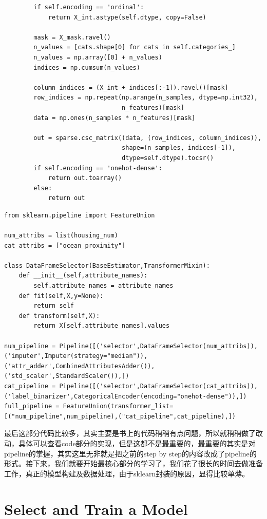 \documentclass[UTF8]{ctexart}
\begin{document}
\begin{lstlisting}
        if self.encoding == 'ordinal':
            return X_int.astype(self.dtype, copy=False)

        mask = X_mask.ravel()
        n_values = [cats.shape[0] for cats in self.categories_]
        n_values = np.array([0] + n_values)
        indices = np.cumsum(n_values)

        column_indices = (X_int + indices[:-1]).ravel()[mask]
        row_indices = np.repeat(np.arange(n_samples, dtype=np.int32),
                                n_features)[mask]
        data = np.ones(n_samples * n_features)[mask]

        out = sparse.csc_matrix((data, (row_indices, column_indices)),
                                shape=(n_samples, indices[-1]),
                                dtype=self.dtype).tocsr()
        if self.encoding == 'onehot-dense':
            return out.toarray()
        else:
            return out
\end{lstlisting}

\begin{lstlisting}
from sklearn.pipeline import FeatureUnion

num_attribs = list(housing_num)
cat_attribs = ["ocean_proximity"]

class DataFrameSelector(BaseEstimator,TransformerMixin):
    def __init__(self,attribute_names):
        self.attribute_names = attribute_names
    def fit(self,X,y=None):
        return self
    def transform(self,X):
        return X[self.attribute_names].values

num_pipeline = Pipeline([('selector',DataFrameSelector(num_attribs)),('imputer',Imputer(strategy="median")),('attr_adder',CombinedAttributesAdder()),('std_scaler',StandardScaler()),])
cat_pipeline = Pipeline([('selector',DataFrameSelector(cat_attribs)),('label_binarizer',CategoricalEncoder(encoding="onehot-dense")),])
full_pipeline = FeatureUnion(transformer_list=[("num_pipeline",num_pipeline),("cat_pipeline",cat_pipeline),])
\end{lstlisting}	

最后这部分代码比较多，其实主要是书上的代码稍稍有点问题，所以就稍稍做了改动，具体可以查看code部分的实现，但是这都不是最重要的，最重要的其实是对pipeline的掌握，其实这里无非就是把之前的step by step的内容改成了pipeline的形式。接下来，我们就要开始最核心部分的学习了，我们花了很长的时间去做准备工作，真正的模型构建及数据处理，由于sklearn封装的原因，显得比较单薄。

\section{Select and Train a Model}
\end{document}
